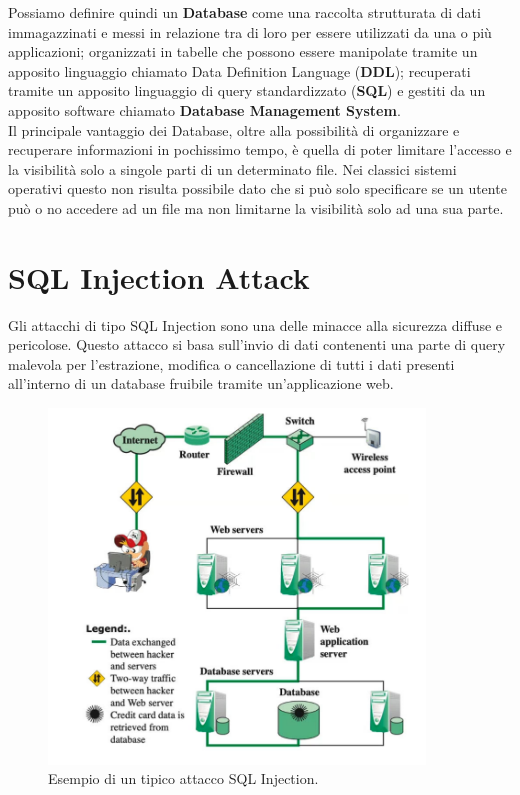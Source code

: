 Possiamo definire quindi un \textbf{Database} come una raccolta strutturata di
dati immagazzinati e messi in relazione tra di loro per essere utilizzati da una
o più applicazioni; organizzati in tabelle che possono essere manipolate tramite
un apposito linguaggio chiamato Data Definition Language (\textbf{DDL}); recuperati
tramite un apposito linguaggio di query standardizzato (\textbf{SQL}) e gestiti
da un apposito software chiamato \textbf{Database Management System}.\\

Il principale vantaggio dei Database, oltre alla possibilità di organizzare e
recuperare informazioni in pochissimo tempo, è quella di poter limitare l'accesso
e la visibilità solo a singole parti di un determinato file. Nei classici sistemi
operativi questo non risulta possibile dato che si può solo specificare se un
utente può o no accedere ad un file ma non limitarne la visibilità solo ad una
sua parte.

\section{SQL Injection Attack}

Gli attacchi di tipo SQL Injection sono una delle minacce alla sicurezza diffuse
e pericolose. Questo attacco si basa sull'invio di dati contenenti una
parte di query malevola per l'estrazione, modifica o cancellazione di tutti i
dati presenti all'interno di un database fruibile tramite un'applicazione web.

\begin{figure}[H]
      \centering
      \includegraphics[width=10cm, keepaspectratio]{capitoli/sql_security/imgs/sql1.png}
      \caption{Esempio di un tipico attacco SQL Injection.}
\end{figure}

